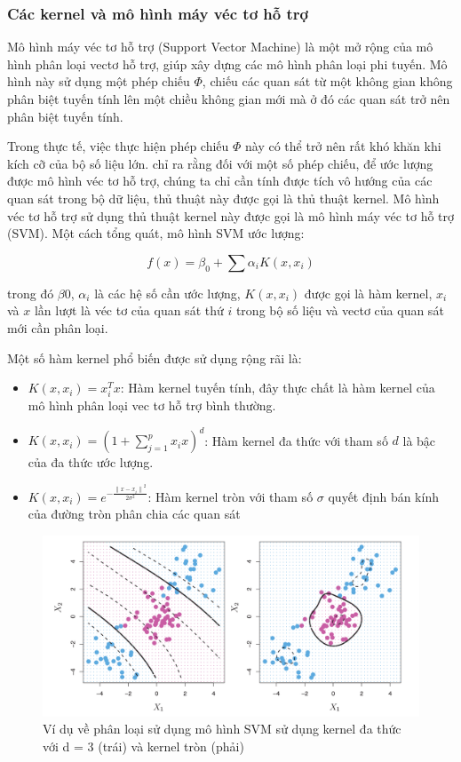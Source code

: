 \subsubsection{Các kernel và mô hình máy véc tơ hỗ trợ}

Mô hình máy véc tơ hỗ trợ (Support Vector Machine) là một mở rộng của mô hình phân loại vectơ hỗ trợ, giúp xây dựng các mô hình phân loại phi tuyến. Mô hình này sử dụng một phép chiếu $\Phi$, chiếu các quan sát từ một không gian không phân biệt tuyến tính lên một chiều không gian mới mà ở đó các quan sát trở nên phân biệt tuyến tính.

Trong thực tế, việc thực hiện phép chiếu $\Phi$ này có thể trở nên rất khó khăn khi kích cỡ của bộ số liệu lớn. \textcite{scholkopf1999advances} chỉ ra rằng đối với một số phép chiếu, để ước lượng được mô hình véc tơ hỗ trợ, chúng ta chỉ cần tính được tích vô hướng của các quan sát trong bộ dữ liệu, thủ thuật này được gọi là thủ thuật kernel. Mô hình véc tơ hỗ trợ sử dụng thủ thuật kernel này được gọi là mô hình máy véc tơ hỗ trợ (SVM). Một cách tổng quát, mô hình SVM ước lượng:

$$
f(x) = \beta_0 + \sum\alpha_i K(x, x_i)
$$

trong đó $\beta0$, $\alpha_i$ là các hệ số cần ước lượng, $K(x, x_i)$ được gọi là hàm kernel, $x_i$ và $x$ lần lượt là véc tơ của quan sát thứ $i$ trong bộ số liệu và vectơ của quan sát mới cần phân loại.

Một số hàm kernel phổ biến được sử dụng rộng rãi là:

\begin{itemize}
  \item{$K(x, x_i) = x_i^T x$}: Hàm kernel tuyến tính, đây thực chất là hàm kernel của mô hình phân loại vec tơ hỗ trợ bình thường.
  \item{$K(x, x_i) =  (1 + \sum_{j = 1}^p x_i x)^d$}: Hàm kernel đa thức với tham số $d$ là bậc của đa thức ước lượng.
  \item{$K(x, x_i) = e^{-\frac{{\|x - x_i\|}^2}{2 \sigma^2}}$}: Hàm kernel tròn với tham số $\sigma$ quyết định bán kính của đường tròn phân chia các quan sát
\end{itemize}

\begin{figure}
  \centering
    \includegraphics[width=\textwidth]{./Figures/svm_kernel_example.png}
  \caption[Ví dụ về phân loại sử dụng mô hình SVM]{Ví dụ về phân loại sử dụng mô hình SVM sử dụng kernel đa thức với d = 3 (trái) và kernel tròn (phải)}
  \label{fig:svm_kernel_example}
\end{figure}

